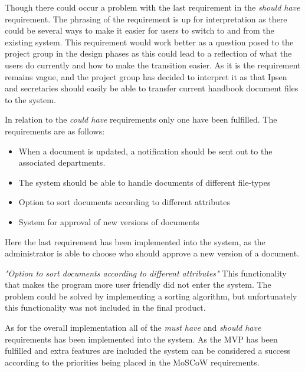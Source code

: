 Though there could occur a problem with the last requirement in the \textit{should have} requirement.
The phrasing of the requirement is up for interpretation as there could be several ways to make it easier for users to switch to and from the existing system.
This requirement would work better as a question posed to the project group in the design phases as this could lead to a reflection of what the users do currently and how to make the transition easier.
As it is the requirement remains vague, and the project group has decided to interpret it as that Ipsen and secretaries should easily be able to transfer current handbook document files to the system.

In relation to the \textit{could have} requirements only one have been fulfilled.
The requirements are as follows:

 \begin{itemize}
 	\item 
    When a document is updated, a notification should be sent out to the associated departments.
	\item 
    The system should be able to handle documents of different file-types
    \item 
    Option to sort documents according to different attributes
    \item 
    System for approval of new versions of documents
\end{itemize}

Here the last requirement has been implemented into the system, as the administrator is able to choose who should approve a new version of a document.

\textit{"Option to sort documents according to different attributes"}
This functionality that makes the program more user friendly did not enter the system.
The problem could be solved by implementing a sorting algorithm, but unfortunately this functionality was not included in the final product.

As for the overall implementation all of the \textit{must have} and \textit{should have} requirements has been implemented into the system.
As the MVP has been fulfilled and extra features are included the system can be considered a success according to the priorities being placed in the MoSCoW requirements.



